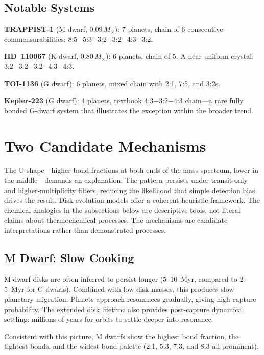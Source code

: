\documentclass[twocolumn,usenatbib]{mnras}
\begin{document}
\subsection{Notable Systems}

\textbf{TRAPPIST-1} (M dwarf, $0.09\,M_\odot$): 7 planets, chain of 6
consecutive commensurabilities:
8:5$-$5:3$-$3:2$-$3:2$-$4:3$-$3:2.

\textbf{HD~110067} (K dwarf, $0.80\,M_\odot$): 6 planets, chain of 5. A
near-uniform crystal: 3:2$-$3:2$-$3:2$-$4:3$-$4:3.

\textbf{TOI-1136} (G dwarf): 6 planets, mixed chain with 2:1, 7:5, and 3:2s.

\textbf{Kepler-223} (G dwarf): 4 planets, textbook
4:3$-$3:2$-$4:3 chain---a rare fully bonded G-dwarf system that illustrates
the exception within the broader trend.

\section{Two Candidate Mechanisms}
\label{sec:mechanisms}

The U-shape---higher bond fractions at both ends of the mass spectrum, lower
in the middle---demands an explanation. The pattern persists under
transit-only and higher-multiplicity filters, reducing the likelihood that
simple detection bias drives the result. Disk evolution models offer a coherent
heuristic framework. The chemical analogies in the subsections below are
descriptive tools, not literal claims about thermochemical processes. The
mechanisms are candidate interpretations rather than demonstrated processes.

\subsection{M Dwarf: Slow Cooking}

M-dwarf disks are often inferred to persist longer (5--10~Myr, compared to
2--5~Myr for G dwarfs)\citep{yasui2010,haisch2001}. Combined with low disk
masses, this produces slow planetary migration. Planets approach resonances
gradually, giving high capture probability. The extended disk lifetime also
provides post-capture dynamical settling: millions of years for orbits to
settle deeper into resonance.

Consistent with this picture, M dwarfs show the highest bond fraction, the
tightest bonds, and the widest bond palette (2:1, 5:3, 7:3, and 8:3 all
prominent).
\end{document}
